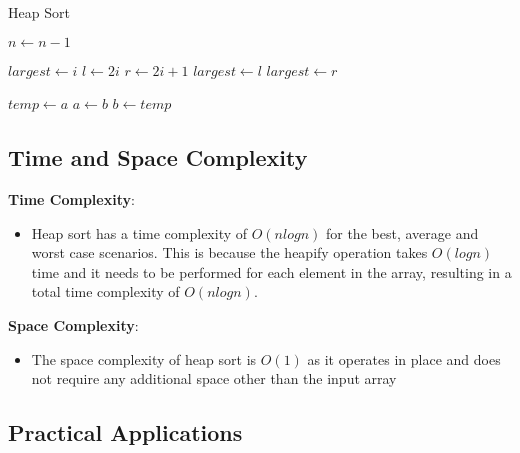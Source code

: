 \documentclass[sigplan,screen]{acmart}
\begin{document}
\begin{algorithm}[H]
\captionsetup{justification=centering}
\caption{Heap Sort}
\begin{algorithmic}
    \State {}
        \State $n \gets n - 1$
    \EndFor
\EndFunction


    \EndFor
\EndFunction


    \State $largest \gets i$
    \State $l \gets 2i$
    \State $r \gets 2i + 1$
        \State $largest \gets l$
    \EndIf
        \State $largest \gets r$
    \EndIf
    \EndIf
\EndFunction


    \State $temp \gets a$
    \State $a \gets b$
    \State $b \gets temp$
\EndFunction
\end{algorithmic}
\end{algorithm}

 
\subsection{Time and Space Complexity}


\textbf{Time Complexity}:
\begin{itemize}
    \item Heap sort has a time complexity of $O(n log n)$ for the best, average and worst case scenarios. This is because the heapify operation takes $O(log n)$ time and it needs to be performed for each element in the array, resulting in a total time complexity of $O(n log n)$. 
\end{itemize}


\textbf{Space Complexity}:
\begin{itemize}
    \item The space complexity of heap sort is $O(1)$ as it operates in place and does not require any additional space other than the input array
\end{itemize}


\subsection{Practical Applications}
\end{document}
